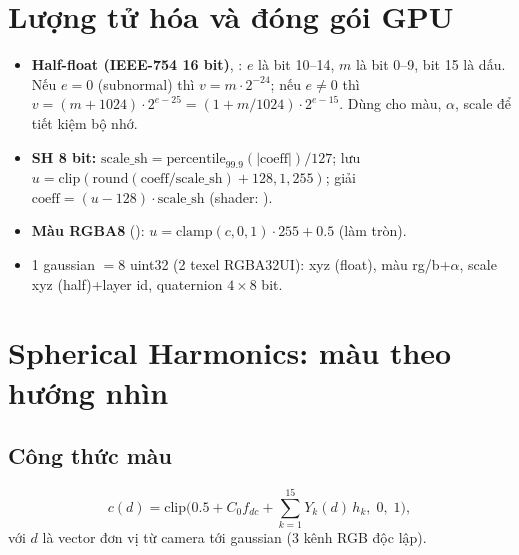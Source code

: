 \section{Lượng tử hóa và đóng gói GPU}
\begin{itemize}
\item \textbf{Half-float (IEEE-754 16 bit)}, : $e$ là bit 10--14, $m$ là bit 0--9, bit 15 là dấu. Nếu $e=0$ (subnormal) thì $v=m\cdot2^{-24}$; nếu $e\ne0$ thì $v=(m+1024)\cdot2^{e-25}=(1+m/1024)\cdot2^{e-15}$. Dùng cho màu, $\alpha$, scale để tiết kiệm bộ nhớ.
\item \textbf{SH 8 bit:} $\mathrm{scale\_sh}=\mathrm{percentile}_{99.9}(|\mathrm{coeff}|)/127$; lưu $u=\mathrm{clip}(\mathrm{round}(\mathrm{coeff}/\mathrm{scale\_sh})+128,1,255)$; giải $\mathrm{coeff}=(u-128)\cdot\mathrm{scale\_sh}$ (shader: ).
\item \textbf{Màu RGBA8} (): $u=\mathrm{clamp}(c,0,1)\cdot255+0.5$ (làm tròn).
\item 1 gaussian $=8$ uint32 (2 texel RGBA32UI): xyz (float), màu rg/b+$\alpha$, scale xyz (half)+layer id, quaternion $4\times8$ bit.
\end{itemize}

\section{Spherical Harmonics: màu theo hướng nhìn}

\subsection{Công thức màu}
\[
c(d)=\mathrm{clip}\Big(0.5+C_0 f_{dc}+\sum_{k=1}^{15}Y_k(d)\,h_k,\;0,\;1\Big),
\]
với $d$ là vector đơn vị từ camera tới gaussian (3 kênh RGB độc lập).

